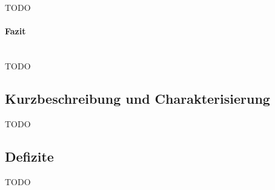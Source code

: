 TODO

\paragraph{Fazit}~\\

TODO

\subsection{Kurzbeschreibung und Charakterisierung}
\label{sub:Kurzbeschreibung und Charakterisierung}
TODO

\subsection{Defizite}
\label{sub:Defizite}
TODO
